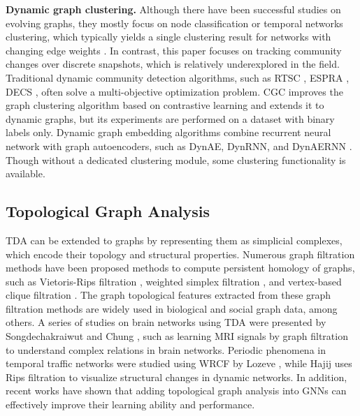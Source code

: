 \documentclass[letterpaper]{article} %
\begin{document}
\noindent\textbf{Dynamic graph clustering.} Although there have been successful studies on evolving graphs, they mostly focus on node classification \cite{pareja2020evolvegcn} or temporal networks clustering, which typically yields a single clustering result for networks with changing edge weights \cite{liu2023deep}. In contrast, this paper focuses on tracking community changes over discrete snapshots, which is relatively underexplored in the field. Traditional dynamic community detection algorithms, such as RTSC \cite{you2021robust}, %
ESPRA \cite{espra}, DECS \cite{liu2020detecting}, often solve a multi-objective optimization problem. %
CGC \cite{park2022cgc} improves the graph clustering algorithm based on contrastive learning and extends it to dynamic graphs, but its experiments are performed on a dataset with binary labels only. Dynamic graph embedding algorithms combine recurrent neural network with graph autoencoders, such as DynAE, DynRNN, and DynAERNN \cite{goyal2020dyngraph2vec}. Though without a dedicated clustering module, some clustering functionality is available. 

\subsection{Topological Graph Analysis}
TDA can be extended to graphs by representing them as simplicial complexes, which encode their topology and structural properties. Numerous graph filtration methods have been proposed methods to compute persistent homology of graphs, such as Vietoris-Rips filtration \cite{dey2022computational}, weighted simplex filtration \cite{huang2016persistent}, and vertex-based clique filtration \cite{rieck2017clique}. The graph topological features extracted from these graph filtration methods are widely used in biological and social graph data, among others. A series of studies on brain networks using TDA were presented by Songdechakraiwut and Chung \cite{songdechakraiwut2023topological}, such as learning MRI signals by graph filtration to understand complex relations in brain networks. Periodic phenomena in temporal traffic networks were studied using WRCF by Lozeve \cite{lozeve2018topological}, while Hajij \cite{Hajij2018} uses Rips filtration to visualize structural changes in dynamic networks. In addition, recent works \cite{yan2021link} have shown that adding topological graph analysis into GNNs can effectively improve their learning ability and performance.
\end{document}
